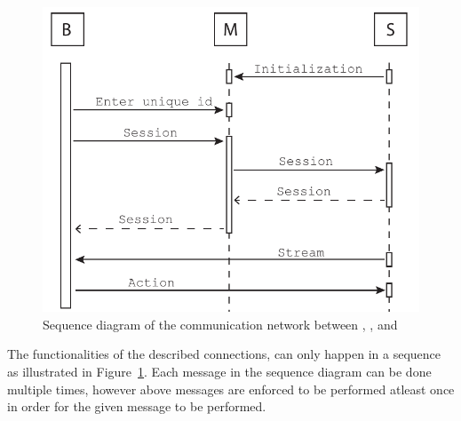 \begin{figure}[!h]
    \centering 
    \includegraphics[width=\textwidth]{gfx/sequence_diagram.pdf}
    \caption{Sequence diagram of the communication network between , , and }
    \label{fig:sequence_diagram}
\end{figure}


The functionalities of the described connections, can only happen in a sequence as illustrated in Figure~\ref{fig:sequence_diagram}.
Each message in the sequence diagram can be done multiple times, however above messages are enforced to be performed atleast once in order for the given message to be performed. \\






